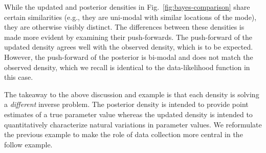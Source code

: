 \begin{ex}
While the updated and posterior densities in Fig.~\ref{fig:bayes-comparison} share certain similarities (e.g., they are uni-modal with similar locations of the mode), they are otherwise visibly distinct.
The differences between these densities is made more evident by examining their push-forwards.
The push-forward of the updated density agrees well with the observed density, which is to be expected.
However, the push-forward of the posterior is bi-modal and does not match the observed density, which we recall is identical to the data-likelihood function in this case.

%

\end{ex}

The takeaway to the above discussion and example is that each density is solving a {\em different} inverse problem.
The posterior density is intended to provide point estimates of a true parameter value whereas the updated density is intended to quantitatively characterize natural variations in parameter values.
We reformulate the previous example to make the role of data collection more central in the follow example.

